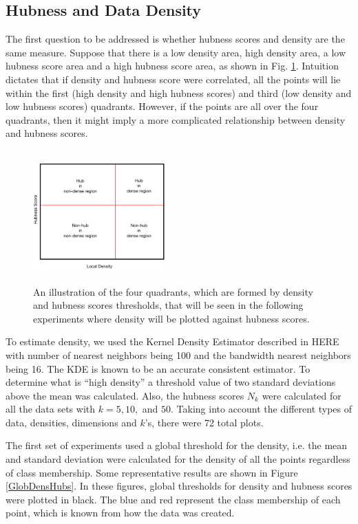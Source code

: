 \documentclass[graybox]{svmult}
\begin{document}
\subsection{Hubness and Data Density}
\label{density}

The first question to be addressed is whether hubness scores and density are the same measure. Suppose that there is a low density area, high density area, a low hubness score area and a high hubness score area, as shown in Fig. \ref{fig:DensHubInt}. Intuition dictates that if density and hubness score were correlated, all the points will lie within the first (high density and high hubness scores) and third (low density and low hubness scores) quadrants. However, if the points are all over the four quadrants, then it might imply a more complicated relationship between density and hubness scores. 

\begin{figure}
\centering
\includegraphics[width=2in,height=2in]{../fig/DensHub-Intuition.png}
\caption{An illustration of the four quadrants, which are formed by density and hubness scores thresholds, that will be seen in the following experiments where density will be plotted against hubness scores.}\label{fig:DensHubInt}
\end{figure}

To estimate density, we used the Kernel Density Estimator described in HERE with number of nearest neighbors being 100 and the bandwidth nearest neighbors being 16. The KDE is known to be an accurate consistent estimator. To determine what is ``high density'' a threshold value of two standard deviations above the mean was calculated. Also, the hubness scores $N_k$ were calculated for all the data sets with $k=5,10,$ and $50$. Taking into account the different types of data, densities, dimensions and $k$'s, there were 72 total plots.

The first set of experiments used a global threshold for the density, i.e. the mean and standard deviation were calculated for the density of all the points regardless of class membership. Some representative results are shown in Figure  \ref{GlobDensHubs}. In these figures, global thresholds for density and hubness scores were plotted in black. The blue and red represent the class membership of each point, which is known from how the data was created. 
\end{document}
